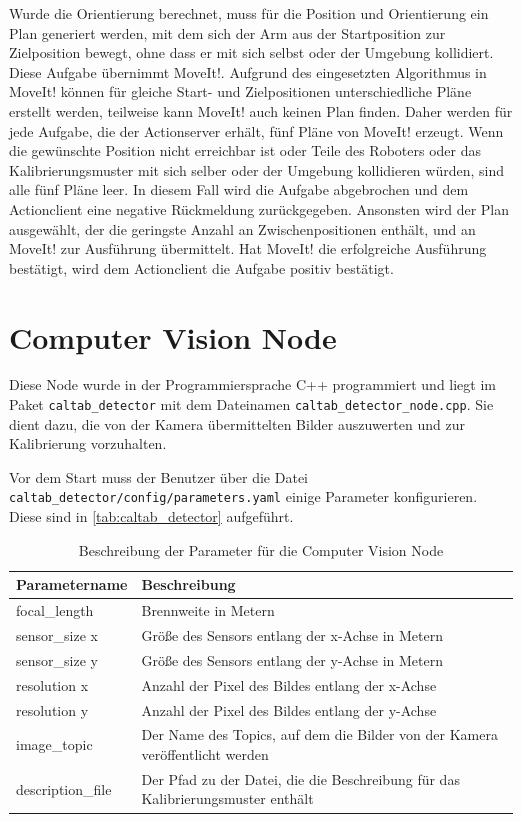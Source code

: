 Wurde die Orientierung berechnet, muss für die Position und Orientierung ein Plan generiert werden, mit dem sich der Arm aus der Startposition zur Zielposition bewegt, ohne dass er mit sich selbst oder der Umgebung kollidiert. Diese Aufgabe übernimmt MoveIt!. Aufgrund des eingesetzten Algorithmus in MoveIt! können für gleiche Start- und Zielpositionen unterschiedliche Pläne erstellt werden, teilweise kann MoveIt! auch keinen Plan finden. Daher werden für jede Aufgabe, die der Actionserver erhält, fünf Pläne von MoveIt! erzeugt. Wenn die gewünschte Position nicht erreichbar ist oder Teile des Roboters oder das Kalibrierungsmuster mit sich selber oder der Umgebung kollidieren würden, sind alle fünf Pläne leer. In diesem Fall wird die Aufgabe abgebrochen und dem Actionclient eine negative Rückmeldung zurückgegeben. Ansonsten wird der Plan ausgewählt, der die geringste Anzahl an Zwischenpositionen enthält, und an MoveIt! zur Ausführung übermittelt. Hat MoveIt! die erfolgreiche Ausführung bestätigt, wird dem Actionclient die Aufgabe positiv bestätigt.

\section{Computer Vision Node} %
\label{sec:caltab_detector_node_impl}
Diese Node wurde in der Programmiersprache C++ programmiert und liegt im Paket \texttt{caltab\_detector} mit dem Dateinamen \texttt{caltab\_detector\_node.cpp}. Sie dient dazu, die von der Kamera übermittelten Bilder auszuwerten und zur Kalibrierung vorzuhalten.

Vor dem Start muss der Benutzer über die Datei \texttt{caltab\_detector/config/parameters.yaml} einige Parameter konfigurieren. Diese sind in \autoref{tab:caltab_detector} aufgeführt.

\begin{table}
\begin{tabularx}{\textwidth}{|l|X|}
	\hline
	Parametername & Beschreibung \\\hline
	focal\_length & Brennweite in Metern \\\hline
	sensor\_size x & Größe des Sensors entlang der x-Achse in Metern \\\hline
	sensor\_size y & Größe des Sensors entlang der y-Achse in Metern \\\hline
	resolution x & Anzahl der Pixel des Bildes entlang der x-Achse \\\hline
	resolution y & Anzahl der Pixel des Bildes entlang der y-Achse \\\hline
	image\_topic & Der Name des Topics, auf dem die Bilder von der Kamera veröffentlicht werden \\\hline
	description\_file & Der Pfad zu der Datei, die die Beschreibung für das Kalibrierungsmuster enthält \\\hline
\end{tabularx}
\caption{Beschreibung der Parameter für die Computer Vision Node}
\label{tab:caltab_detector}
\end{table}

